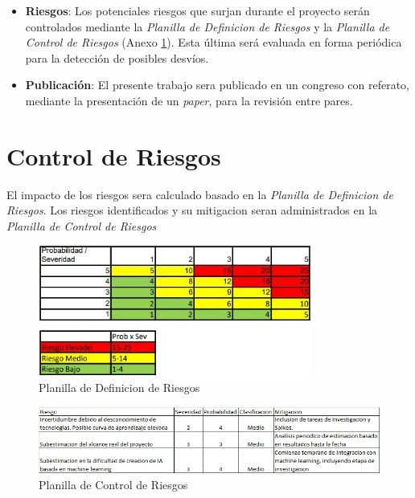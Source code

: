 \documentclass[a4paper]{article}
\begin{document}
\begin{itemize}
    \item \textbf{Riesgos}: Los potenciales riesgos que surjan durante el proyecto serán controlados mediante la \textit{Planilla de Definicion de Riesgos} y la \textit{Planilla de Control de Riesgos} (Anexo \ref{anexo:control-de-riesgos}). Esta última será evaluada en forma periódica para la detección de posibles desvíos.
    \item \textbf{Publicación}: El presente trabajo sera publicado en un congreso con referato, mediante la presentación de un \textit{paper}, para la revisión entre pares.
\end{itemize}




\appendix
\section{Control de Riesgos}
\label{anexo:control-de-riesgos}

El impacto de los riesgos sera calculado basado en la \textit{Planilla de Definicion de Riesgos}. Los riesgos identificados y su mitigacion seran administrados en la \textit{Planilla de Control de Riesgos}

\begin{figure}[ht]
    \centering
    \includegraphics[width=0.8\textwidth]{./images/risk-definition.jpg}
    \caption{Planilla de Definicion de Riesgos}
    \label{fig:rd}
\end{figure}

\begin{figure}[ht]
    \centering
    \includegraphics[width=1\textwidth]{./images/risk-management.jpg}
    \caption{Planilla de Control de Riesgos}
    \label{fig:rc}
\end{figure}
\end{document}
